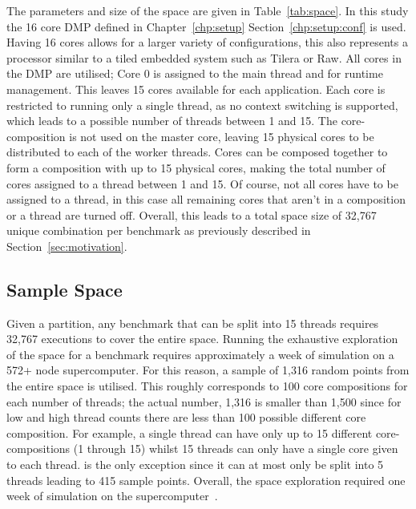 The parameters and size of the space are given in Table~\ref{tab:space}.
In this study the 16 core DMP defined in Chapter~\ref{chp:setup} Section~\ref{chp:setup:conf} is used.
Having 16 cores allows for a larger variety of configurations, this also represents a processor similar to a tiled embedded system such as Tilera or Raw.
All cores in the DMP are utilised; Core 0 is assigned to the main thread and for runtime management.
This leaves 15 cores available for each application.
Each core is restricted to running only a single thread, as no context switching is supported, which leads to a possible number of threads between 1 and 15.
The core-composition is not used on the master core, leaving 15 physical cores to be distributed to each of the worker threads.
Cores can be composed together to form a composition with up to 15 physical cores, making the total number of cores assigned to a thread between 1 and 15.
Of course, not all cores have to be assigned to a thread, in this case all remaining cores that aren't in a composition or a thread are turned off.
Overall, this leads to a total space size of 32,767 unique combination per benchmark as previously described in Section~\ref{sec:motivation}.

\subsection{Sample Space}

Given a partition, any benchmark that can be split into 15 threads requires 32,767 executions to cover the entire space.
Running the exhaustive exploration of the space for a benchmark requires approximately a week of simulation on a 572+ node supercomputer.
For this reason, a sample of 1,316 random points from the entire space is utilised.
This roughly corresponds to 100 core compositions for each number of threads; the actual number, 1,316 is smaller than 1,500 since for low and high thread counts there are less than 100 possible different core composition.
For example, a single thread can have only up to 15 different core-compositions (1 through 15) whilst 15 threads can only have a single core given to each thread.
 is the only exception since it can at most only be split into 5 threads leading to 415 sample points.
Overall, the space exploration required one week of simulation on the supercomputer~\cite{ecdf}.

